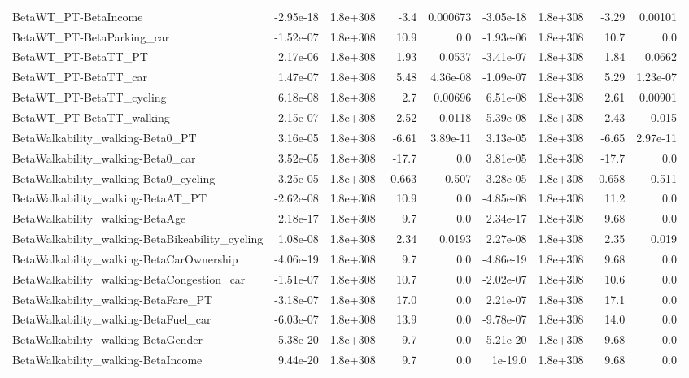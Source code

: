 \begin{tabular}{lrrrrrrrr}
BetaWT_PT-BetaIncome & -2.95e-18 & 1.8e+308 & -3.4 & 0.000673 & -3.05e-18 & 1.8e+308 & -3.29 & 0.00101 \\
BetaWT_PT-BetaParking_car & -1.52e-07 & 1.8e+308 & 10.9 & 0.0 & -1.93e-06 & 1.8e+308 & 10.7 & 0.0 \\
BetaWT_PT-BetaTT_PT & 2.17e-06 & 1.8e+308 & 1.93 & 0.0537 & -3.41e-07 & 1.8e+308 & 1.84 & 0.0662 \\
BetaWT_PT-BetaTT_car & 1.47e-07 & 1.8e+308 & 5.48 & 4.36e-08 & -1.09e-07 & 1.8e+308 & 5.29 & 1.23e-07 \\
BetaWT_PT-BetaTT_cycling & 6.18e-08 & 1.8e+308 & 2.7 & 0.00696 & 6.51e-08 & 1.8e+308 & 2.61 & 0.00901 \\
BetaWT_PT-BetaTT_walking & 2.15e-07 & 1.8e+308 & 2.52 & 0.0118 & -5.39e-08 & 1.8e+308 & 2.43 & 0.015 \\
BetaWalkability_walking-Beta0_PT & 3.16e-05 & 1.8e+308 & -6.61 & 3.89e-11 & 3.13e-05 & 1.8e+308 & -6.65 & 2.97e-11 \\
BetaWalkability_walking-Beta0_car & 3.52e-05 & 1.8e+308 & -17.7 & 0.0 & 3.81e-05 & 1.8e+308 & -17.7 & 0.0 \\
BetaWalkability_walking-Beta0_cycling & 3.25e-05 & 1.8e+308 & -0.663 & 0.507 & 3.28e-05 & 1.8e+308 & -0.658 & 0.511 \\
BetaWalkability_walking-BetaAT_PT & -2.62e-08 & 1.8e+308 & 10.9 & 0.0 & -4.85e-08 & 1.8e+308 & 11.2 & 0.0 \\
BetaWalkability_walking-BetaAge & 2.18e-17 & 1.8e+308 & 9.7 & 0.0 & 2.34e-17 & 1.8e+308 & 9.68 & 0.0 \\
BetaWalkability_walking-BetaBikeability_cycling & 1.08e-08 & 1.8e+308 & 2.34 & 0.0193 & 2.27e-08 & 1.8e+308 & 2.35 & 0.019 \\
BetaWalkability_walking-BetaCarOwnership & -4.06e-19 & 1.8e+308 & 9.7 & 0.0 & -4.86e-19 & 1.8e+308 & 9.68 & 0.0 \\
BetaWalkability_walking-BetaCongestion_car & -1.51e-07 & 1.8e+308 & 10.7 & 0.0 & -2.02e-07 & 1.8e+308 & 10.6 & 0.0 \\
BetaWalkability_walking-BetaFare_PT & -3.18e-07 & 1.8e+308 & 17.0 & 0.0 & 2.21e-07 & 1.8e+308 & 17.1 & 0.0 \\
BetaWalkability_walking-BetaFuel_car & -6.03e-07 & 1.8e+308 & 13.9 & 0.0 & -9.78e-07 & 1.8e+308 & 14.0 & 0.0 \\
BetaWalkability_walking-BetaGender & 5.38e-20 & 1.8e+308 & 9.7 & 0.0 & 5.21e-20 & 1.8e+308 & 9.68 & 0.0 \\
BetaWalkability_walking-BetaIncome & 9.44e-20 & 1.8e+308 & 9.7 & 0.0 & 1e-19.0 & 1.8e+308 & 9.68 & 0.0 \\

\end{tabular}

